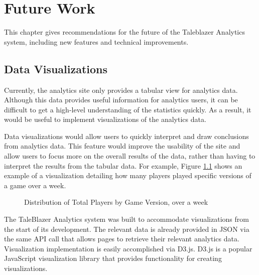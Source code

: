 \chapter{Future Work}

This chapter gives recommendations for the future of the Taleblazer Analytics system, including new features and technical improvements. 

\section{Data Visualizations}

Currently, the analytics site only provides a tabular view for analytics data. Although this data provides useful information for analytics users, it can be difficult to get a high-level understanding of the statistics quickly. As a result, it would be useful to implement visualizations of the analytics data. 

Data visualizations would allow users to quickly interpret and draw conclusions from analytics data. This feature would improve the usability of the site and allow users to focus more on the overall results of the data, rather than having to interpret the results from the tabular data. For example, Figure \ref{fig:num_completed_viz} shows an example of a visualization detailing how many players played specific versions of a game over a week. 

\begin{figure}[hbt]
	\caption{\label{fig:num_completed_viz} Distribution of Total Players by Game Version, over a week}
\end{figure}

The TaleBlazer Analytics system was built to accommodate visualizations from the start of its development. The relevant data is already provided in JSON via the same API call that allows pages to retrieve their relevant analytics data. Visualization implementation is easily accomplished via D3.js. D3.js is a popular JavaScript visualization library that provides functionality for creating visualizations. 

